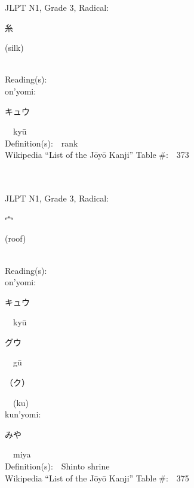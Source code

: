 \begin{multicols}{2}
{JLPT N1, Grade 3, Radical:\ \ {\begin{CJK}{UTF8}{min} 糸 \end{CJK}} (silk) } \\
Reading(s):\ \ \\
{\hspace*{1em}}on'yomi:\ \ \\
{\hspace*{2em}}{\begin{CJK}{UTF8}{min} キュウ \end{CJK}}\ \ ky\=u\ \ \\
Definition(s):\ \ rank \\
Wikipedia ``List of the J\=oy\=o Kanji'' Table \#:\ \ 373 \\
\ \ \\
{\fontsize{34pt}{40pt}  }\ \ \\  %
{JLPT N1, Grade 3, Radical:\ \ {\begin{CJK}{UTF8}{min} 宀 \end{CJK}} (roof) } \\
Reading(s):\ \ \\
{\hspace*{1em}}on'yomi:\ \ \\
{\hspace*{2em}}{\begin{CJK}{UTF8}{min} キュウ \end{CJK}}\ \ ky\=u\ \ \\
{\hspace*{2em}}{\begin{CJK}{UTF8}{min} グウ \end{CJK}}\ \ g\=u\ \ \\
{\hspace*{2em}}{\begin{CJK}{UTF8}{min} （ク） \end{CJK}}\ \ (ku)\ \ \\
{\hspace*{1em}}kun'yomi:\ \ \\
{\hspace*{2em}}{\begin{CJK}{UTF8}{min} みや \end{CJK}}\ \ miya\ \ \\
Definition(s):\ \ Shinto shrine \\
Wikipedia ``List of the J\=oy\=o Kanji'' Table \#:\ \ 375 \\

\end{multicols}
